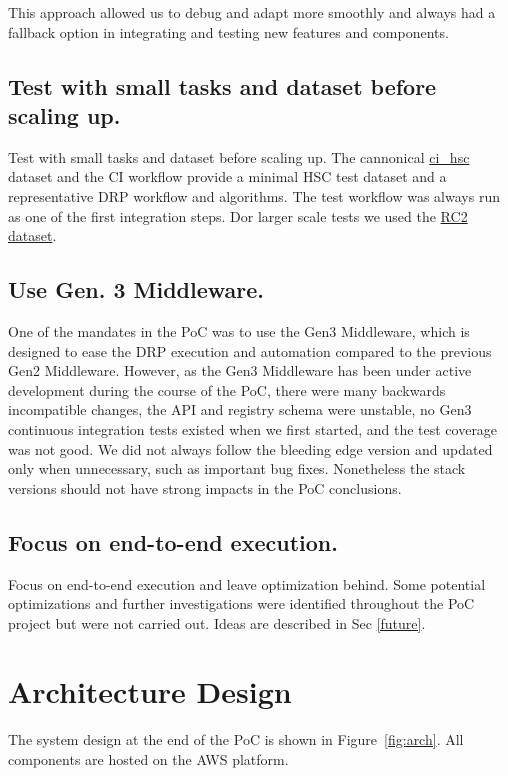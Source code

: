 This approach allowed us to debug and adapt more smoothly and always had a fallback option in integrating and testing new features and components.

\subsection{Test with small tasks and dataset before scaling up.}

Test with small tasks and dataset before scaling up. The cannonical \href{https://github.com/lsst/ci\_hsc}{ci\_hsc} dataset and the CI workflow provide a minimal HSC test dataset and a representative DRP workflow and algorithms.
The test workflow was always run as one of the first integration steps. Dor larger scale tests we used the \href{https://jira.lsstcorp.org/browse/DM-11345}{RC2 dataset}. 

\subsection{Use Gen. 3 Middleware.}

One of the mandates in the PoC was to use the Gen3 Middleware, which is designed to ease the DRP execution and automation compared to the previous Gen2 Middleware.
However, as the Gen3 Middleware has been under active development during the course of the PoC, there were many backwards incompatible changes, the API and registry schema were unstable, no Gen3 continuous integration tests existed when we first started, and the test coverage was not good.
We did not always follow the bleeding edge version and updated only when unnecessary, such as important bug fixes.
Nonetheless the stack versions should not have strong impacts in the PoC conclusions.

\subsection{Focus on end-to-end execution.}

Focus on end-to-end execution and leave optimization behind.
Some potential optimizations and further investigations were identified throughout the PoC project but were not carried out.
Ideas are described in Sec \ref{future}.


\section{Architecture Design}

The system design at the end of the PoC is shown in Figure~\ref{fig:arch}.
All components are hosted on the AWS platform.

